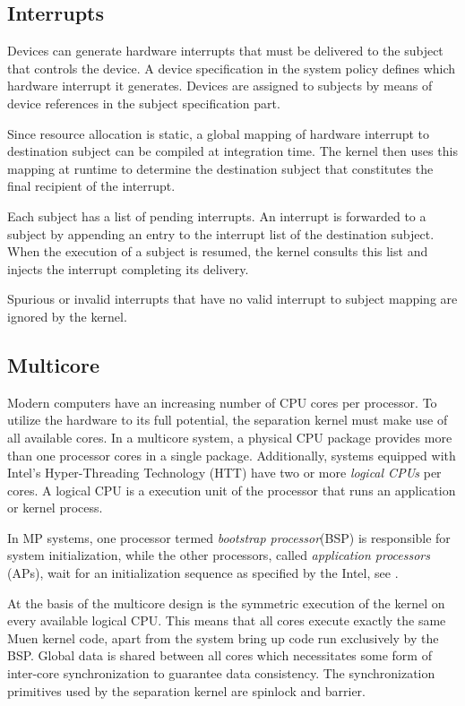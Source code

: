 \subsection{Interrupts}
Devices can generate hardware interrupts that must be delivered to the subject
that controls the device. A device specification in the system policy defines
which hardware interrupt it generates. Devices are assigned to subjects by means
of device references in the subject specification part.

Since resource allocation is static, a global mapping of hardware interrupt to
destination subject can be compiled at integration time. The kernel then uses
this mapping at runtime to determine the destination subject that constitutes
the final recipient of the interrupt.

Each subject has a list of pending interrupts. An interrupt is forwarded to a
subject by appending an entry to the interrupt list of the destination subject.
When the execution of a subject is resumed, the kernel consults this list and
injects the interrupt completing its delivery.

Spurious or invalid interrupts that have no valid interrupt to subject mapping
are ignored by the kernel.

\subsection{Multicore}\label{subsec:multicore}
Modern computers have an increasing number of CPU cores per processor. To
utilize the hardware to its full potential, the separation kernel must make use
of all available cores. In a multicore system, a physical CPU package provides
more than one processor cores in a single package. Additionally, systems
equipped with Intel's Hyper-Threading Technology (HTT) have two or more
\emph{logical CPUs} per cores. A logical CPU is a execution unit of the
processor that runs an application or kernel process.

In MP systems, one processor termed
\emph{bootstrap processor}(BSP) is responsible for
system initialization, while the other processors, called
\emph{application processors} (APs), wait for an
initialization sequence as specified by the Intel, see \cite{intel:mp}.

At the basis of the multicore design is the symmetric execution of the kernel on
every available logical CPU. This means that all cores execute exactly the same
Muen kernel code, apart from the system bring up code run exclusively by the
BSP. Global data is shared between all cores which necessitates some form of
inter-core synchronization to guarantee data consistency. The synchronization
primitives used by the separation kernel are spinlock and barrier.

